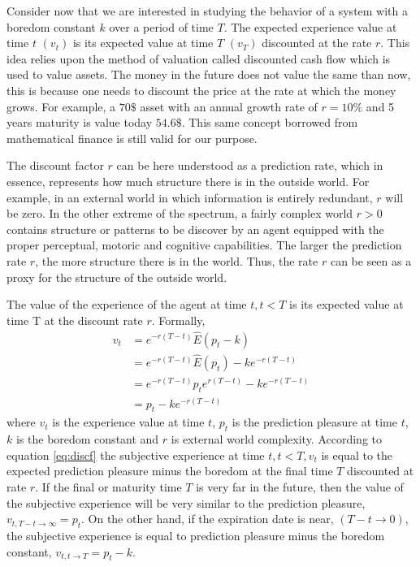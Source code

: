 \documentclass[11pt, onecolumn]{article}
\begin{document}

Consider now that we are interested in studying the behavior of a system with a boredom constant $k$ over a period of time $T$. The expected experience value at time $t$ $(v_t)$ is its expected value at time $T$ $(v_T)$ discounted at the rate $r$. This idea relies upon the method of valuation called discounted cash flow which is used to value assets. The money in the future does not value the same than now, this is because one needs to discount the price at the rate at which the money grows. For example, a $70\$$ asset with an annual growth rate of $r=10\%$ and 5 years maturity is value today $54.6\$$. This same concept borrowed from mathematical finance is still valid for our purpose.

The discount factor $r$ can be here understood as a prediction rate, which in essence, represents how much structure there is in the outside world. For example, in an external world in which information is entirely redundant, $r$ will be zero.
In the other extreme of the spectrum, a fairly complex world  $r >0$ contains  structure or patterns to be discover by an agent equipped with the proper perceptual, motoric and cognitive capabilities. The larger the prediction rate $r$, the more structure there is in the world. Thus, the rate $r$ can be seen as a proxy for the structure of the outside world. 

The value of the experience of the agent at time $t, t < T$ is its expected value at time T at the discount rate $r$. Formally,
\begin{equation}
\begin{split}
    v_t  & =  e^{-r(T-t)}\hat{E}(p_{t} - k)  \\
       & = e^{-r(T-t)}\hat{E}(p_{t}) - k e^{-r(T-t)} \\
       & = e^{-r(T-t)}p_{t} e^{r(T-t)}  - k e^{-r(T-t)} \\ 
        & = p_{t}  - k e^{-r(T-t)} 
\end{split}
\label{eq:discf}
\end{equation}
where $v_t$ is the experience value at time $t$, $p_{t}$ is the prediction pleasure at time $t$, $k$ is the boredom constant and $r$ is external world complexity.   
According to equation \ref{eq:discf} the subjective experience at time $t, t < T, v_t$ is equal to the expected prediction pleasure minus the boredom at the final time $T$ discounted at rate $r$. 
If the final or maturity time $T$ is very far in the future, then the value of the subjective experience will be very similar to the prediction pleasure, $ v_{t,T -t \to \infty} =  p_{t}$. On the other hand, if the expiration date is near, $(T-t \to 0)$, the subjective experience is equal to prediction pleasure minus the boredom constant, $ v_{t,t \to T} =  p_{t} - k $. 
\end{document}
